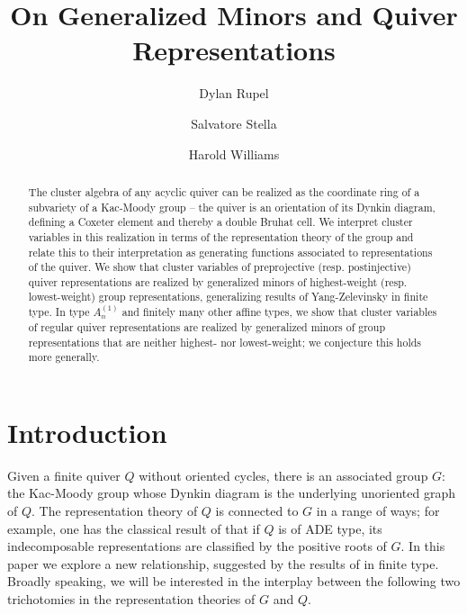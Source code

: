 \documentclass[12pt]{amsart}
\theoremstyle{remark}
\numberwithin{equation}{section}
\numberwithin{figure}{section}
\begin{document}
\title{On Generalized Minors and Quiver Representations}

\author[Dylan Rupel]{Dylan Rupel}
\address[Dylan Rupel]{University of Notre Dame}

\author[Salvatore Stella]{Salvatore Stella}
\address[Salvatore Stella]{Universit\`a degli studi di Roma ``La Sapienza''}

\author[Harold Williams]{Harold Williams}
\address[Harold Williams]{University of Texas at Austin}

\begin{abstract}
  The cluster algebra of any acyclic quiver can be realized as the coordinate ring of a subvariety of a Kac-Moody group -- the quiver is an orientation of its Dynkin diagram, defining a Coxeter element and thereby a double Bruhat cell.
  We interpret cluster variables in this realization in terms of the representation theory of the group and relate this to their interpretation as generating functions associated to representations of the quiver.
  We show that cluster variables of preprojective (resp. postinjective) quiver representations are realized by generalized minors of highest-weight (resp. lowest-weight) group representations, generalizing results of Yang-Zelevinsky in finite type.
  In type $A_n^{\!(1)}$ and finitely many other affine types, we show that cluster variables of regular quiver representations are realized by generalized minors of group representations that are neither highest- nor lowest-weight; we conjecture this holds more generally.
\end{abstract}

\maketitle
\tableofcontents
\newpage

\section{Introduction}

Given a finite quiver $Q$ without oriented cycles, there is an associated group $G$: the Kac-Moody group whose Dynkin diagram is the underlying unoriented graph of $Q$.
The representation theory of $Q$ is connected to $G$ in a range of ways; for example, one has the classical result of \cite{BGP73} that if $Q$ is of ADE type, its indecomposable representations are classified by the positive roots of $G$.
In this paper we explore a new relationship, suggested by the results of \cite{YZ08} in finite type.
Broadly speaking, we will be interested in the interplay between the following two trichotomies in the representation theories of $G$ and $Q$.
\end{document}
